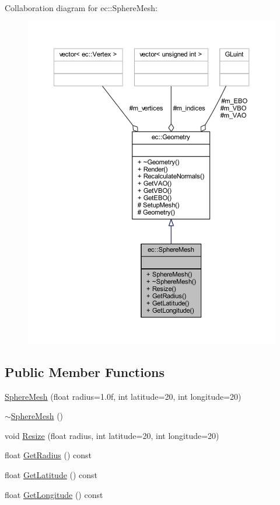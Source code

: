 Collaboration diagram for ec\+:\+:Sphere\+Mesh\+:
\nopagebreak
\begin{figure}[H]
\begin{center}
\leavevmode
\includegraphics[width=350pt]{classec_1_1_sphere_mesh__coll__graph}
\end{center}
\end{figure}
\subsection*{Public Member Functions}
\begin{DoxyCompactItemize}
\item 
\mbox{\hyperlink{classec_1_1_sphere_mesh_aef9a67fadbe115ae17af30d5f07c232d}{Sphere\+Mesh}} (float radius=1.\+0f, int latitude=20, int longitude=20)
\item 
\mbox{\hyperlink{classec_1_1_sphere_mesh_ac2d7dd9ad61b5061644259f4c84df00b}{$\sim$\+Sphere\+Mesh}} ()
\item 
void \mbox{\hyperlink{classec_1_1_sphere_mesh_a11a1d25477d5e65603efc7fd36a4056c}{Resize}} (float radius, int latitude=20, int longitude=20)
\item 
float \mbox{\hyperlink{classec_1_1_sphere_mesh_aefa0c1d8caab82b0a36e099e43008032}{Get\+Radius}} () const
\item 
float \mbox{\hyperlink{classec_1_1_sphere_mesh_ab4379e6b27a1375a4b4994f53318f6b5}{Get\+Latitude}} () const
\item 
float \mbox{\hyperlink{classec_1_1_sphere_mesh_af6cc3be0f4584a93dcd3b82e93e48392}{Get\+Longitude}} () const
\end{DoxyCompactItemize}
